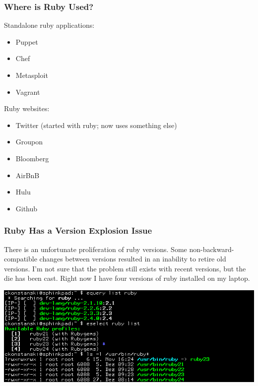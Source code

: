 \documentclass[helvetica,english,utf8,notitle,nologo]{beamer}
\begin{document}
\begin{frame}
  \frametitle{Where is Ruby Used?}

  Standalone ruby applications:

  \begin{itemize}
  \item Puppet
  \item Chef
  \item Metasploit
  \item Vagrant
  \end{itemize}

  Ruby websites:

  \begin{itemize}
  \item Twitter (started with ruby; now uses something else)
  \item Groupon
  \item Bloomberg
  \item AirBnB
  \item Hulu
  \item Github
  \end{itemize}
\end{frame}

\begin{frame}
  \frametitle{Ruby Has a Version Explosion Issue}

  There is an unfortunate proliferation of ruby versions. Some
  non-backward-compatible changes between versions resulted in an
  inability to retire old versions. I'm not sure that the problem
  still exists with recent versions, but the die has been cast. Right
  now I have four versions of ruby installed on my laptop.

  \includegraphics[scale=0.5]{eselect_1}
\end{frame}
\end{document}
